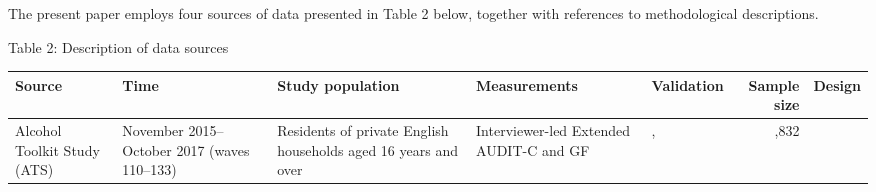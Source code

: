 \documentclass[]{article}
\begin{document}
The present paper employs four sources of data presented in Table 2
below, together with references to methodological descriptions.

Table 2: Description of data sources

\begin{longtable}[]{@{}lllllrl@{}}
\toprule
\begin{minipage}[b]{0.12\columnwidth}\raggedright
Source\strut
\end{minipage} & \begin{minipage}[b]{0.12\columnwidth}\raggedright
Time\strut
\end{minipage} & \begin{minipage}[b]{0.12\columnwidth}\raggedright
Study population\strut
\end{minipage} & \begin{minipage}[b]{0.12\columnwidth}\raggedright
Measurements\strut
\end{minipage} & \begin{minipage}[b]{0.12\columnwidth}\raggedright
Validation\strut
\end{minipage} & \begin{minipage}[b]{0.07\columnwidth}\raggedleft
Sample size\strut
\end{minipage} & \begin{minipage}[b]{0.12\columnwidth}\raggedright
Design\strut
\end{minipage}\tabularnewline
\midrule
\endhead
\begin{minipage}[t]{0.12\columnwidth}\raggedright
Alcohol Toolkit Study (ATS) \citep{Beard2015a}\strut
\end{minipage} & \begin{minipage}[t]{0.12\columnwidth}\raggedright
November 2015--October 2017 (waves 110--133)\strut
\end{minipage} & \begin{minipage}[t]{0.12\columnwidth}\raggedright
Residents of private English households aged 16 years and over\strut
\end{minipage} & \begin{minipage}[t]{0.12\columnwidth}\raggedright
Interviewer-led Extended AUDIT-C and GF\strut
\end{minipage} & \begin{minipage}[t]{0.12\columnwidth}\raggedright
\citep{Heeb2005}, \citep{Greenfield2009}\strut
\end{minipage} & \begin{minipage}[t]{0.07\columnwidth}\raggedleft
40,832\strut

\end{minipage}
\end{longtable}
\end{document}
